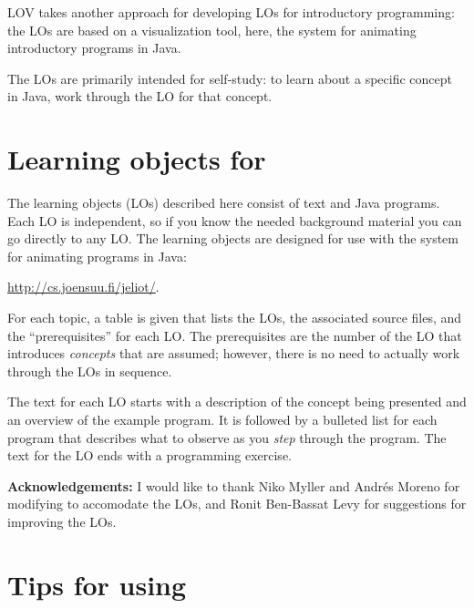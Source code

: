 LOV takes another approach for developing LOs for introductory programming:
the LOs are based on a visualization tool, here, the \jel{} system for animating
introductory programs in Java.

The LOs are primarily intended for self-study: to learn about a specific
concept in Java, work through the LO for that concept.

\section*{Learning objects for \jel{}}

The learning objects (LOs) described here consist of text and Java 
programs. Each LO is independent, so if you know the needed background 
material you can go directly to any LO. The learning objects are designed
for use with the \jel{} system for animating programs in Java:
\begin{center}
\url{http://cs.joensuu.fi/jeliot/}.
\end{center}

For each topic, a table is given that lists the LOs, the associated source 
files, and the ``prerequisites'' for each LO. The prerequisites are the number
of the LO that introduces \emph{concepts} that are assumed;
however, there is no need to actually work through the LOs in sequence.

The text for each LO starts with a description of the concept being presented 
and an overview of the example program. It is followed by a bulleted list for 
each program that describes what to observe as you \emph{step} through the 
program. The text for the LO ends with a programming exercise.

\vspace*{3ex}

\textbf{Acknowledgements:} I would like to thank Niko Myller and Andr\'es Moreno
for modifying \jel{} to accomodate the LOs, and Ronit Ben-Bassat Levy for suggestions
for improving the LOs.

\newpage

\section*{Tips for using \jel{}}

